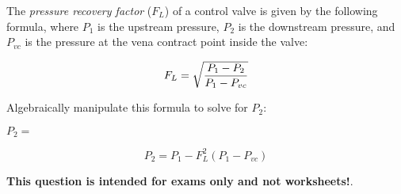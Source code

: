 

The {\it pressure recovery factor} ($F_L$) of a control valve is given by the following formula, where $P_1$ is the upstream pressure, $P_2$ is the downstream pressure, and $P_{vc}$ is the pressure at the vena contract point inside the valve:
 
$$F_L = \sqrt{P_1 - P_2 \over P_1 - P_{vc}}$$

Algebraically manipulate this formula to solve for $P_2$:

\vskip 20pt

$P_2 = $







$$P_2 = P_1 - F_L^2(P_1 - P_{vc})$$







{\bf This question is intended for exams only and not worksheets!}.



